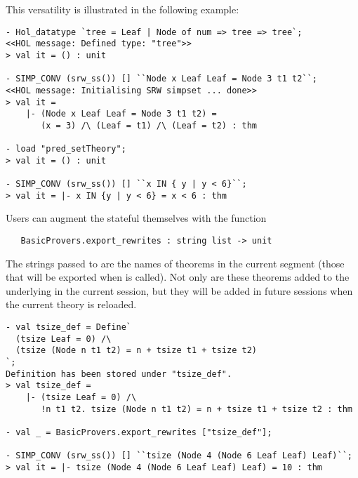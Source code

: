 {This versatility is illustrated in the following example:
\begin{session}
\begin{hol}
\begin{verbatim}
- Hol_datatype `tree = Leaf | Node of num => tree => tree`;
<<HOL message: Defined type: "tree">>
> val it = () : unit

- SIMP_CONV (srw_ss()) [] ``Node x Leaf Leaf = Node 3 t1 t2``;
<<HOL message: Initialising SRW simpset ... done>>
> val it =
    |- (Node x Leaf Leaf = Node 3 t1 t2) =
       (x = 3) /\ (Leaf = t1) /\ (Leaf = t2) : thm

- load "pred_setTheory";
> val it = () : unit

- SIMP_CONV (srw_ss()) [] ``x IN { y | y < 6}``;
> val it = |- x IN {y | y < 6} = x < 6 : thm
\end{verbatim}
\end{hol}
\end{session}
%
Users can augment the stateful \simpset{} themselves with the function
%
\begin{boxed}
\begin{hol}
\begin{verbatim}
   BasicProvers.export_rewrites : string list -> unit
\end{verbatim}
\end{hol}
\end{boxed}
The strings passed to  are the names of theorems
in the current segment (those that will be exported when
 is called).  Not only are these theorems added to
the underlying \simpset{} in the current session, but they will be
added in future sessions when the current theory is reloaded.
\begin{session}
\begin{hol}
\begin{verbatim}
- val tsize_def = Define`
  (tsize Leaf = 0) /\
  (tsize (Node n t1 t2) = n + tsize t1 + tsize t2)
`;
Definition has been stored under "tsize_def".
> val tsize_def =
    |- (tsize Leaf = 0) /\
       !n t1 t2. tsize (Node n t1 t2) = n + tsize t1 + tsize t2 : thm

- val _ = BasicProvers.export_rewrites ["tsize_def"];

- SIMP_CONV (srw_ss()) [] ``tsize (Node 4 (Node 6 Leaf Leaf) Leaf)``;
> val it = |- tsize (Node 4 (Node 6 Leaf Leaf) Leaf) = 10 : thm
\end{verbatim}
\end{hol}
\end{session}

}
